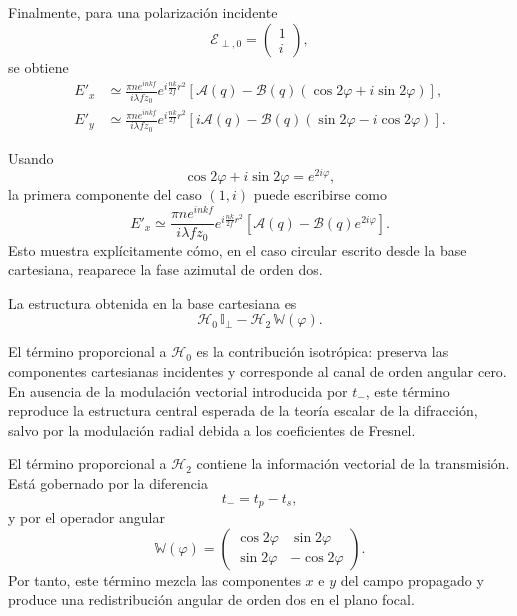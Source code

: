Finalmente, para una polarización incidente
\begin{equation}
\mathscr E_{\perp,0}
=
\begin{pmatrix}
1\\
i
\end{pmatrix},
\end{equation}
se obtiene
\begin{equation}
\begin{aligned}
E'_x
&\simeq
\frac{\pi n e^{inkf}}{i\lambda f z_0}
e^{i\frac{nk}{2f}r^2}
\left[
\mathcal A(q)
-
\mathcal B(q)
\left(
\cos2\varphi+i\sin2\varphi
\right)
\right],
\\
E'_y
&\simeq
\frac{\pi n e^{inkf}}{i\lambda f z_0}
e^{i\frac{nk}{2f}r^2}
\left[
i\mathcal A(q)
-
\mathcal B(q)
\left(
\sin2\varphi-i\cos2\varphi
\right)
\right].
\end{aligned}
\label{eq:cartesian_case_1i}
\end{equation}

Usando
\begin{equation}
  \cos2\varphi+i\sin2\varphi
  =
  e^{2i\varphi},
\end{equation}
la primera componente del caso $(1,i)$ puede escribirse como
\begin{equation}
E'_x
\simeq
\frac{\pi n e^{inkf}}{i\lambda f z_0}
e^{i\frac{nk}{2f}r^2}
\left[
\mathcal A(q)
-
\mathcal B(q)e^{2i\varphi}
\right].
\end{equation}
Esto muestra explícitamente cómo, en el caso circular escrito desde la base
cartesiana, reaparece la fase azimutal de orden dos.

La estructura obtenida en la base cartesiana es
\begin{equation}
  \mathscr H_0\,\mathbb I_\perp
  -
  \mathscr H_2\,\mathbb W(\varphi).
\end{equation}

El término proporcional a $\mathscr H_0$ es la contribución isotrópica:
preserva las componentes cartesianas incidentes y corresponde al canal de
orden angular cero. En ausencia de la modulación vectorial introducida por
$t_-$, este término reproduce la estructura central esperada de la teoría
escalar de la difracción, salvo por la modulación radial debida a los
coeficientes de Fresnel.

El término proporcional a $\mathscr H_2$ contiene la información vectorial de
la transmisión. Está gobernado por la diferencia
\begin{equation}
  t_-
  =
  t_p-t_s,
\end{equation}
y por el operador angular
\begin{equation}
  \mathbb W(\varphi)
  =
  \begin{pmatrix}
    \cos 2\varphi & \sin 2\varphi \\
    \sin 2\varphi & -\cos 2\varphi
  \end{pmatrix}.
\end{equation}
Por tanto, este término mezcla las componentes $x$ e $y$ del campo propagado
y produce una redistribución angular de orden dos en el plano focal.

